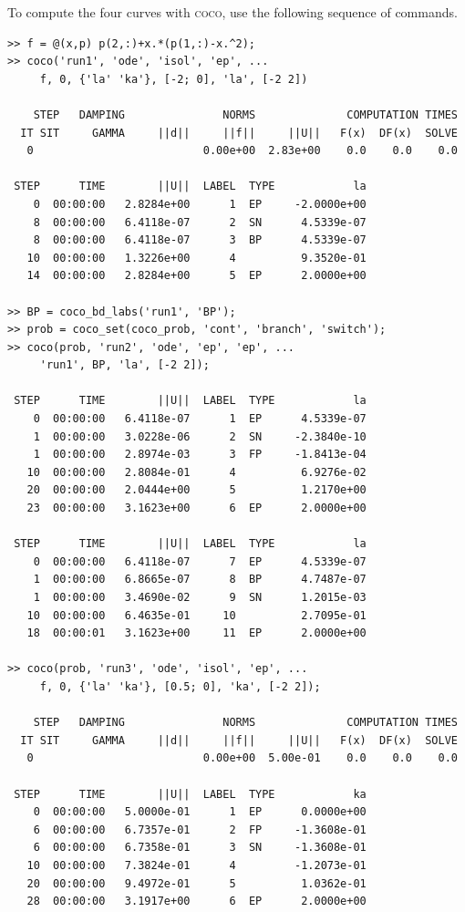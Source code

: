 To compute the four curves with \textsc{coco}, use the following sequence of commands.
\begin{lstlisting}[language=coco-highlight,frame=lines]
>> f = @(x,p) p(2,:)+x.*(p(1,:)-x.^2);
>> coco('run1', 'ode', 'isol', 'ep', ...
     f, 0, {'la' 'ka'}, [-2; 0], 'la', [-2 2])

    STEP   DAMPING               NORMS              COMPUTATION TIMES
  IT SIT     GAMMA     ||d||     ||f||     ||U||   F(x)  DF(x)  SOLVE
   0                          0.00e+00  2.83e+00    0.0    0.0    0.0

 STEP      TIME        ||U||  LABEL  TYPE            la
    0  00:00:00   2.8284e+00      1  EP     -2.0000e+00
    8  00:00:00   6.4118e-07      2  SN      4.5339e-07
    8  00:00:00   6.4118e-07      3  BP      4.5339e-07
   10  00:00:00   1.3226e+00      4          9.3520e-01
   14  00:00:00   2.8284e+00      5  EP      2.0000e+00

>> BP = coco_bd_labs('run1', 'BP');
>> prob = coco_set(coco_prob, 'cont', 'branch', 'switch');
>> coco(prob, 'run2', 'ode', 'ep', 'ep', ...
     'run1', BP, 'la', [-2 2]);

 STEP      TIME        ||U||  LABEL  TYPE            la
    0  00:00:00   6.4118e-07      1  EP      4.5339e-07
    1  00:00:00   3.0228e-06      2  SN     -2.3840e-10
    1  00:00:00   2.8974e-03      3  FP     -1.8413e-04
   10  00:00:00   2.8084e-01      4          6.9276e-02
   20  00:00:00   2.0444e+00      5          1.2170e+00
   23  00:00:00   3.1623e+00      6  EP      2.0000e+00

 STEP      TIME        ||U||  LABEL  TYPE            la
    0  00:00:00   6.4118e-07      7  EP      4.5339e-07
    1  00:00:00   6.8665e-07      8  BP      4.7487e-07
    1  00:00:00   3.4690e-02      9  SN      1.2015e-03
   10  00:00:00   6.4635e-01     10          2.7095e-01
   18  00:00:01   3.1623e+00     11  EP      2.0000e+00

>> coco(prob, 'run3', 'ode', 'isol', 'ep', ...
     f, 0, {'la' 'ka'}, [0.5; 0], 'ka', [-2 2]);

    STEP   DAMPING               NORMS              COMPUTATION TIMES
  IT SIT     GAMMA     ||d||     ||f||     ||U||   F(x)  DF(x)  SOLVE
   0                          0.00e+00  5.00e-01    0.0    0.0    0.0

 STEP      TIME        ||U||  LABEL  TYPE            ka
    0  00:00:00   5.0000e-01      1  EP      0.0000e+00
    6  00:00:00   6.7357e-01      2  FP     -1.3608e-01
    6  00:00:00   6.7358e-01      3  SN     -1.3608e-01
   10  00:00:00   7.3824e-01      4         -1.2073e-01
   20  00:00:00   9.4972e-01      5          1.0362e-01
   28  00:00:00   3.1917e+00      6  EP      2.0000e+00


\end{lstlisting}
